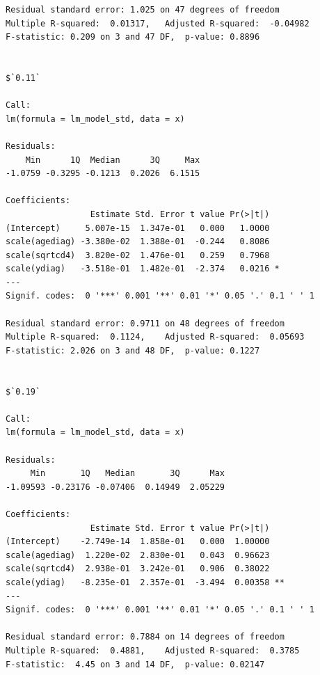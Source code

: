 \documentclass[]{revtex4}\usepackage[]{graphicx}\usepackage[]{color}
\makeatletter
\newenvironment{kframe}{%
 \def\at@end@of@kframe{}%
 \ifinner\ifhmode%
  \def\at@end@of@kframe{\end{minipage}}%
  \begin{minipage}{\columnwidth}%
 \fi\fi%
 \def\FrameCommand##1{\hskip\@totalleftmargin \hskip-\fboxsep
 \colorbox{shadecolor}{##1}\hskip-\fboxsep
     \hskip-\linewidth \hskip-\@totalleftmargin \hskip\columnwidth}%
 \MakeFramed {\advance\hsize-\width
   \@totalleftmargin\z@ \linewidth\hsize
   \@setminipage}}%
 {\par\unskip\endMakeFramed%
 \at@end@of@kframe}
\newenvironment{knitrout}{}{} %
\makeatother
\begin{document}
\begin{knitrout}
\begin{kframe}
\begin{verbatim}
Residual standard error: 1.025 on 47 degrees of freedom
Multiple R-squared:  0.01317,	Adjusted R-squared:  -0.04982 
F-statistic: 0.209 on 3 and 47 DF,  p-value: 0.8896


$`0.11`

Call:
lm(formula = lm_model_std, data = x)

Residuals:
    Min      1Q  Median      3Q     Max 
-1.0759 -0.3295 -0.1213  0.2026  6.1515 

Coefficients:
                 Estimate Std. Error t value Pr(>|t|)  
(Intercept)     5.007e-15  1.347e-01   0.000   1.0000  
scale(agediag) -3.380e-02  1.388e-01  -0.244   0.8086  
scale(sqrtcd4)  3.820e-02  1.476e-01   0.259   0.7968  
scale(ydiag)   -3.518e-01  1.482e-01  -2.374   0.0216 *
---
Signif. codes:  0 '***' 0.001 '**' 0.01 '*' 0.05 '.' 0.1 ' ' 1

Residual standard error: 0.9711 on 48 degrees of freedom
Multiple R-squared:  0.1124,	Adjusted R-squared:  0.05693 
F-statistic: 2.026 on 3 and 48 DF,  p-value: 0.1227


$`0.19`

Call:
lm(formula = lm_model_std, data = x)

Residuals:
     Min       1Q   Median       3Q      Max 
-1.09593 -0.23176 -0.07406  0.14949  2.05229 

Coefficients:
                 Estimate Std. Error t value Pr(>|t|)   
(Intercept)    -2.749e-14  1.858e-01   0.000  1.00000   
scale(agediag)  1.220e-02  2.830e-01   0.043  0.96623   
scale(sqrtcd4)  2.938e-01  3.242e-01   0.906  0.38022   
scale(ydiag)   -8.235e-01  2.357e-01  -3.494  0.00358 **
---
Signif. codes:  0 '***' 0.001 '**' 0.01 '*' 0.05 '.' 0.1 ' ' 1

Residual standard error: 0.7884 on 14 degrees of freedom
Multiple R-squared:  0.4881,	Adjusted R-squared:  0.3785 
F-statistic:  4.45 on 3 and 14 DF,  p-value: 0.02147
\end{verbatim}
\end{kframe}
\end{knitrout}
\end{document}
